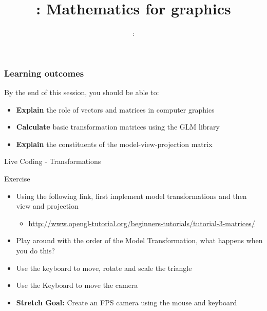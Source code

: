 \usepackage{../../beamerthemeFalmouthGamesAcademy}
\usepackage{multimedia}
\graphicspath{ {../../} }




\usepackage[normalem]{ulem}
\usepackage{wasysym}

\usepackage{pdfpages}

\usetikzlibrary{arrows,automata}




\title{\sessionnumber: Mathematics for graphics}
\subtitle{\modulecode: \moduletitle}

\frame{\titlepage} 

\begin{frame}
	\frametitle{Learning outcomes}
	By the end of this session, you should be able to:
	\begin{itemize}
		\item \textbf{Explain} the role of vectors and matrices in computer graphics
		\item \textbf{Calculate} basic transformation matrices using the GLM library
		\item \textbf{Explain} the constituents of the model-view-projection matrix
	\end{itemize}
\end{frame}






\begin{frame}
	\begin{center}
		Live Coding - Transformations
	\end{center}
\end{frame}

\begin{frame}{Exercise}
	\begin{itemize}
		\item Using the following link, first implement model transformations and then view and projection
		\begin{itemize}
			\item \url{http://www.opengl-tutorial.org/beginners-tutorials/tutorial-3-matrices/}
		\end{itemize}
		\item Play around with the order of the Model Transformation, what happens when you do this?
		\item Use the keyboard to move, rotate and scale the triangle
		\item Use the Keyboard to move the camera
		\item \textbf{Stretch Goal:} Create an FPS camera using the mouse and keyboard
	\end{itemize}
\end{frame}


